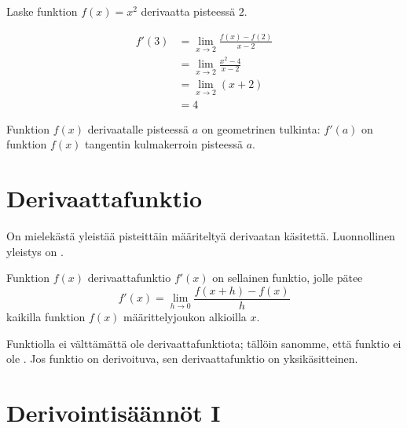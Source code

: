 \begin{esimerkki}
	Laske funktion $f(x) = x^2$ derivaatta pisteessä $2$.
	\begin{esimratk}
		\begin{align*}
			f'(3) &= \lim\limits_{x \to 2} \frac{f(x)-f(2)}{x-2} \\
				  &= \lim\limits_{x \to 2} \frac{x^2-4}{x-2} \\
				  &= \lim\limits_{x \to 2} (x+2) \\
				  &= 4
		\end{align*}
	\end{esimratk}
	
	\begin{center}
	\end{center}
	
\end{esimerkki}

Funktion $f(x)$ derivaatalle pisteessä $a$ on geometrinen tulkinta:
$f'(a)$ on funktion $f(x)$ tangentin kulmakerroin pisteessä $a$.

\section{Derivaattafunktio}

On mielekästä yleistää pisteittäin määriteltyä derivaatan käsitettä.
Luonnollinen yleistys on .

Funktion $f(x)$ derivaattafunktio $f'(x)$ on sellainen funktio, jolle pätee
\[ f'(x) = \lim\limits_{h \to 0} \frac{f(x+h)-f(x)}{h} \]
kaikilla funktion $f(x)$ määrittelyjoukon alkioilla $x$.

Funktiolla ei välttämättä ole derivaattafunktiota; tällöin sanomme, että funktio
ei ole . Jos funktio on derivoituva, sen
derivaattafunktio on yksikäsitteinen.

\section{Derivointisäännöt I}


